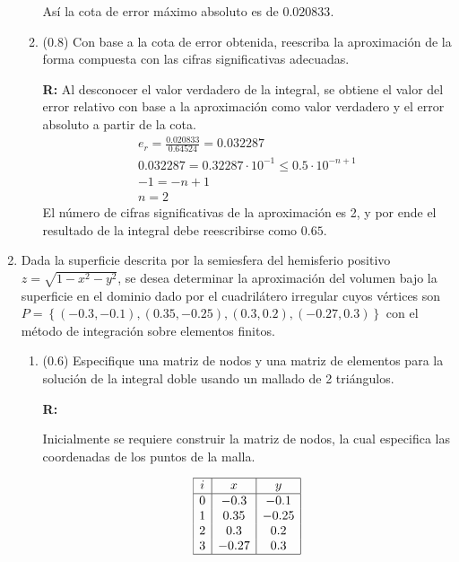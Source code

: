 \documentclass[12pt]{article}
\begin{document}
\begin{enumerate}[leftmargin=*,widest=9]
\begin{enumerate}[label=\alph*]
    Así la cota de error máximo absoluto es de \(0.020833\).

    \item (\(0.8\)) Con base a la cota de error obtenida, reescriba la aproximación de la forma compuesta con las cifras significativas adecuadas.

    \textbf{R:} Al desconocer el valor verdadero de la integral, se obtiene el valor del error relativo con base a la aproximación como valor verdadero y el error absoluto a partir de la cota.
\begin{eqnarray*}
e_r = \frac{0.020833}{0.64524} = 0.032287\\
0.032287  = 0.32287\cdot 10^{-1} \leq 0.5 \cdot 10^{-n+1}\\
-1 = -n + 1\\
n = 2
\end{eqnarray*}
El número de cifras significativas de la aproximación es 2, y por ende el resultado de la integral debe reescribirse como \(0.65\).

    \end{enumerate}

    \item Dada la superficie descrita por la semiesfera del hemisferio positivo \(z=\sqrt{1 - x^2 - y^2}\), se desea determinar la aproximación del volumen bajo la superficie en el dominio dado por el cuadrilátero irregular cuyos vértices son
    \(
    P = \left\lbrace (-0.3, -0.1), (0.35, -0.25), (0.3, 0.2), (-0.27, 0.3)\right\rbrace
    \)
    con el método de integración sobre elementos finitos.
    \begin{enumerate}[label=\alph*]
    \item (\(0.6\)) Especifique una matriz de nodos y una matriz de elementos para la solución de la integral doble usando un mallado de 2 triángulos.

	   \textbf{R:}

Inicialmente se requiere construir la matriz de nodos, la cual especifica las coordenadas de los puntos de la malla.

     \[
     \begin{array}{|c|c|c|}
     \hline
     i & x & y\\
     \hline
     0 & -0.3 & -0.1\\
     1 & 0.35 & -0.25\\
     2 & 0.3 & 0.2\\
     3 & -0.27 & 0.3\\
     \hline
     \end{array}
     \]


\end{enumerate}
\end{enumerate}
\end{document}

